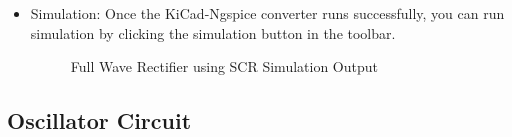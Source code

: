 \begin{itemize}
\pagebreak

\item Simulation: Once the KiCad-Ngspice converter runs successfully, you can run simulation by clicking the simulation button in the toolbar.
    \begin{figure}[!htp]
    \centering
     \hfill
    \caption{Full Wave Rectifier using SCR Simulation Output}
\end{figure}

\end{itemize}


\pagebreak

\subsection{Oscillator Circuit}

